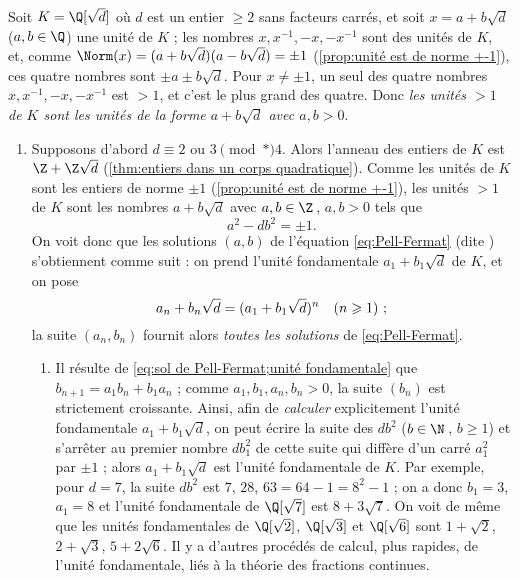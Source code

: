 \documentclass[11pt, %
  title in boldface,
  theorem in new line,
  theorem numbering = section,
  number theorems separately,
  simple name,
]{beaulivre}
\begin{document}
    Soit \( K = \Q[\sqrt{d}] \) où \( d \) est un entier \( \geqslant 2 \) sans facteurs carrés, et soit \( x = a + b \sqrt{d} \) (\( a,b \in \Q \)) une unité de \( K \) ; les nombres \( x, x^{-1}, -x, -x^{-1} \) sont des unités de \( K \), et, comme \( \Norm(x) = (a+b\sqrt{d})(a-b\sqrt{d}) = \pm 1 \) (\cref{prop:unité est de norme +-1}), ces quatre nombres sont \( \pm a \pm b\sqrt{d} \). Pour \( x \neq \pm 1 \), un seul des quatre nombres \( x, x^{-1}, -x, -x^{-1} \) est \( > 1 \), et c'est le plus grand des quatre. Donc \emph{les unités \( > 1 \) de \( K \) sont les unités de la forme \( a+b\sqrt{d} \) avec \( a, b > 0 \)}.
    \begin{enumerate}
        \item \label{unités des corps quadratiques réels;cas1} Supposons d'abord \( d \equiv 2 \) ou \( 3 \pmod*{4} \). Alors l'anneau des entiers de \( K \) est \( \Z + \Z\sqrt{d} \) (\cref{thm:entiers dans un corps quadratique}). Comme les unités de \( K \) sont les entiers de norme \( \pm 1 \) (\cref{prop:unité est de norme +-1}), les unités \( > 1 \) de \( K \) sont les nombres \( a+b\sqrt{d} \) avec \( a,b \in \Z \)\,, \( a, b > 0 \) tels que
        \begin{equation}\label{eq:Pell-Fermat}
            a^2 - db^2 = \pm 1.
        \end{equation}
        On voit donc que les solutions  \( (a,b) \) de l'équation \eqref{eq:Pell-Fermat} (dite ) s'obtiennent comme suit : on prend l'unité fondamentale \( a_1 + b_1 \sqrt{d} \) de \( K \), et on pose
        \begin{equation}\label{eq:sol de Pell-Fermat;unité fondamentale}
            a_n + b_n \sqrt{d} = (a_1 + b_1 \sqrt{d})^n \quad \text{(\( n \geqslant 1 \)) ;}
        \end{equation}
        la suite \( (a_n, b_n) \) fournit alors \emph{toutes les solutions} de \eqref{eq:Pell-Fermat}.
        \begin{remark}
            \begin{enumerate}
                \item Il résulte de \eqref{eq:sol de Pell-Fermat;unité fondamentale} que \( b_{n+1} = a_1 b_n + b_1 a_n \) ; comme \( a_1, b_1, a_n, b_n > 0 \), la suite \( (b_n) \) est strictement croissante. Ainsi, afin de \emph{calculer} explicitement l'unité fondamentale \( a_1 + b_1 \sqrt{d} \), on peut écrire la suite des \( d b^2 \) (\( b \in \N \)\,, \( b \geqslant 1 \)) et s'arrêter au premier nombre \( d b_1^2 \) de cette suite qui diffère d'un carré \( a_1^2 \) par \( \pm 1 \) ; alors \( a_1 + b_1 \sqrt{d} \) est l'unité fondamentale de \( K \). Par exemple, pour \( d = 7 \), la suite \( d b^2 \) est \( 7 \), \( 28 \), \( 63 = 64 - 1 = 8^2 - 1 \) ; on a donc \( b_1 = 3 \), \( a_1 = 8 \) et l'unité fondamentale de \( \Q[\sqrt{7}] \) est \( 8 + 3\sqrt{7} \). On voit de même que les unités fondamentales de \( \Q[\sqrt{2}] \), \( \Q[\sqrt{3}] \) et \( \Q[\sqrt{6}] \) sont \( 1+\sqrt{2} \), \( 2+\sqrt{3} \), \( 5+2\sqrt{6} \). Il y a d'autres procédés de calcul, plus rapides, de l'unité fondamentale, liés à la théorie des fractions continues.

\end{enumerate}
\end{remark}
\end{enumerate}
\end{document}
